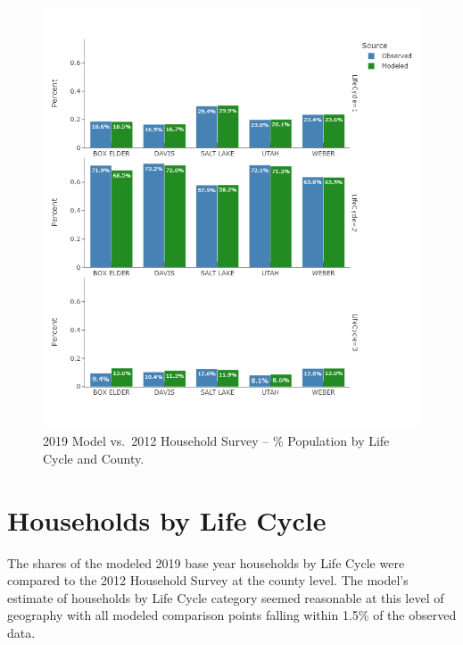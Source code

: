 \documentclass[
  letterpaper,
  DIV=11,
  numbers=noendperiod]{scrreprt}
\begin{document}
\begin{figure}[H]

{\centering \includegraphics{v9x/v900/validation/_pictures/1-plot4.png}

}

\caption{\label{fig-pdf-lc-pop}2019 Model vs.~2012 Household Survey --
\% Population by Life Cycle and County.}

\end{figure}

\hypertarget{households-by-life-cycle}{%
\section{Households by Life Cycle}\label{households-by-life-cycle}}

The shares of the modeled 2019 base year households by Life Cycle were
compared to the 2012 Household Survey at the county level. The model's
estimate of households by Life Cycle category seemed reasonable at this
level of geography with all modeled comparison points falling within
1.5\% of the observed data.
\end{document}
